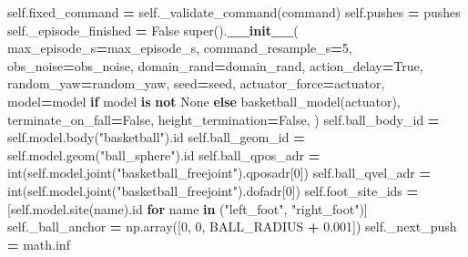 \documentclass[
  american,
  11pt,
  letterpaper,
]{article}
\newenvironment{Shaded}{\begin{snugshade}}{\end{snugshade}}
\newcommand{\BuiltInTok}[1]{#1}
\newcommand{\ControlFlowTok}[1]{\textcolor[rgb]{0.13,0.29,0.53}{\textbf{#1}}}
\newcommand{\DecValTok}[1]{\textcolor[rgb]{0.00,0.00,0.81}{#1}}
\newcommand{\FloatTok}[1]{\textcolor[rgb]{0.00,0.00,0.81}{#1}}
\newcommand{\FunctionTok}[1]{\textcolor[rgb]{0.13,0.29,0.53}{\textbf{#1}}}
\newcommand{\KeywordTok}[1]{\textcolor[rgb]{0.13,0.29,0.53}{\textbf{#1}}}
\newcommand{\NormalTok}[1]{#1}
\newcommand{\OperatorTok}[1]{\textcolor[rgb]{0.81,0.36,0.00}{\textbf{#1}}}
\newcommand{\StringTok}[1]{\textcolor[rgb]{0.31,0.60,0.02}{#1}}
\newcommand{\VariableTok}[1]{\textcolor[rgb]{0.00,0.00,0.00}{#1}}
\renewenvironment{Shaded}{\par\smallskip}{\par\smallskip}
\begin{document}
\begin{Shaded}
\begin{Highlighting}[]
        \VariableTok{self}\NormalTok{.fixed\_command }\OperatorTok{=} \VariableTok{self}\NormalTok{.\_validate\_command(command)}
        \VariableTok{self}\NormalTok{.pushes }\OperatorTok{=}\NormalTok{ pushes}
        \VariableTok{self}\NormalTok{.\_episode\_finished }\OperatorTok{=} \VariableTok{False}
        \BuiltInTok{super}\NormalTok{().}\FunctionTok{\_\_init\_\_}\NormalTok{(}
\NormalTok{            max\_episode\_s}\OperatorTok{=}\NormalTok{max\_episode\_s, command\_resample\_s}\OperatorTok{=}\DecValTok{5}\NormalTok{,}
\NormalTok{            obs\_noise}\OperatorTok{=}\NormalTok{obs\_noise, domain\_rand}\OperatorTok{=}\NormalTok{domain\_rand, action\_delay}\OperatorTok{=}\VariableTok{True}\NormalTok{,}
\NormalTok{            random\_yaw}\OperatorTok{=}\NormalTok{random\_yaw, seed}\OperatorTok{=}\NormalTok{seed, actuator\_force}\OperatorTok{=}\NormalTok{actuator,}
\NormalTok{            model}\OperatorTok{=}\NormalTok{model }\ControlFlowTok{if}\NormalTok{ model }\KeywordTok{is} \KeywordTok{not} \VariableTok{None} \ControlFlowTok{else}\NormalTok{ basketball\_model(actuator),}
\NormalTok{            terminate\_on\_fall}\OperatorTok{=}\VariableTok{False}\NormalTok{, height\_termination}\OperatorTok{=}\VariableTok{False}\NormalTok{,}
\NormalTok{        )}
        \VariableTok{self}\NormalTok{.ball\_body\_id }\OperatorTok{=} \VariableTok{self}\NormalTok{.model.body(}\StringTok{"basketball"}\NormalTok{).}\BuiltInTok{id}
        \VariableTok{self}\NormalTok{.ball\_geom\_id }\OperatorTok{=} \VariableTok{self}\NormalTok{.model.geom(}\StringTok{"ball\_sphere"}\NormalTok{).}\BuiltInTok{id}
        \VariableTok{self}\NormalTok{.ball\_qpos\_adr }\OperatorTok{=} \BuiltInTok{int}\NormalTok{(}\VariableTok{self}\NormalTok{.model.joint(}\StringTok{"basketball\_freejoint"}\NormalTok{).qposadr[}\DecValTok{0}\NormalTok{])}
        \VariableTok{self}\NormalTok{.ball\_qvel\_adr }\OperatorTok{=} \BuiltInTok{int}\NormalTok{(}\VariableTok{self}\NormalTok{.model.joint(}\StringTok{"basketball\_freejoint"}\NormalTok{).dofadr[}\DecValTok{0}\NormalTok{])}
        \VariableTok{self}\NormalTok{.foot\_site\_ids }\OperatorTok{=}\NormalTok{ [}\VariableTok{self}\NormalTok{.model.site(name).}\BuiltInTok{id} \ControlFlowTok{for}\NormalTok{ name }\KeywordTok{in}\NormalTok{ (}\StringTok{"left\_foot"}\NormalTok{, }\StringTok{"right\_foot"}\NormalTok{)]}
        \VariableTok{self}\NormalTok{.\_ball\_anchor }\OperatorTok{=}\NormalTok{ np.array([}\DecValTok{0}\NormalTok{, }\DecValTok{0}\NormalTok{, BALL\_RADIUS }\OperatorTok{+} \FloatTok{0.001}\NormalTok{])}
        \VariableTok{self}\NormalTok{.\_next\_push }\OperatorTok{=}\NormalTok{ math.inf}


\end{Highlighting}
\end{Shaded}
\end{document}
